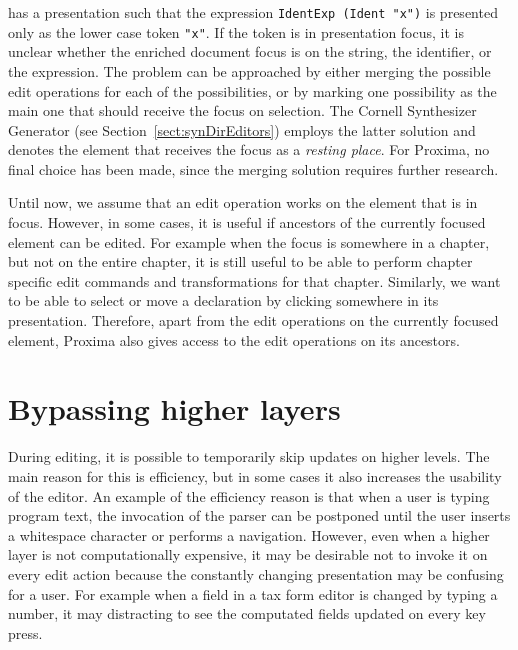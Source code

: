 has a presentation such that the expression \verb|IdentExp (Ident "x")| is presented only as the lower case token \verb|"x"|. If the token is in presentation focus, it is unclear whether the enriched document focus is on the string, the identifier, or the expression. The problem can be approached by either merging the possible edit operations for each of the possibilities, or by marking one possibility as the main one that should receive the focus on selection. The Cornell Synthesizer Generator (see Section~\ref{sect:synDirEditors}) employs the latter solution and denotes the element that receives the focus as a {\em resting place}. For Proxima, no final choice has been made, since the merging solution requires further research.





Until now, we assume that an edit operation works on the element that is in focus. However, in some cases, it is useful if ancestors of the currently focused element can be edited. For example when the focus is somewhere in a chapter, but not on the entire chapter, it is still useful to be able to perform chapter specific edit commands and transformations for that chapter. Similarly, we want to be able to select or move a declaration by clicking somewhere in its presentation. Therefore, apart from the edit operations on the currently focused element, Proxima also gives access to the edit operations on its ancestors. 


\section{Bypassing higher layers} \label{sect:bypassingLayers}


During editing, it is possible to temporarily skip updates on higher levels. The main reason for this is efficiency, but in some cases it also increases the usability of the editor. An example of the efficiency reason is that when a user is typing program text, the invocation of the parser can be postponed until the user inserts a whitespace character or performs a navigation. However, even when a higher layer is not computationally expensive, it may be desirable not to invoke it on every edit action because the constantly changing presentation may be confusing for a user. For example when a field in a tax form editor is changed by typing a number, it may distracting to see the computated fields updated on every key press.

